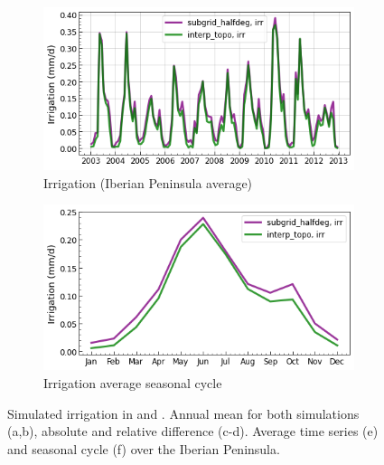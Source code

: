 \begin{figure}[htbp]
    \begin{subfigure}[b]{0.48\textwidth}
        \caption{Irrigation (Iberian Peninsula average)}
        \includegraphics[width=\textwidth]{images/chap3/time_series/irrigation_time_series.png}
    \end{subfigure}    
    \begin{subfigure}[b]{0.48\textwidth}
        \caption{Irrigation average seasonal cycle}
        \includegraphics[width=\textwidth]{images/chap3/time_series/irrigation_seasonal_cycle.png}
    \end{subfigure}

    \caption{Simulated irrigation in \std and \native. Annual mean for both simulations (a,b), absolute and relative difference (c-d). Average time series (e) and seasonal cycle (f) over the Iberian Peninsula.}
    \label{fig:irrigation_halfdeg_eval}
\end{figure}

